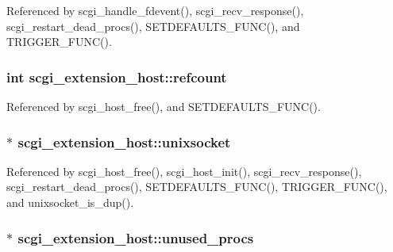Referenced by scgi\-\_\-handle\-\_\-fdevent(), scgi\-\_\-recv\-\_\-response(), scgi\-\_\-restart\-\_\-dead\-\_\-procs(), S\-E\-T\-D\-E\-F\-A\-U\-L\-T\-S\-\_\-\-F\-U\-N\-C(), and T\-R\-I\-G\-G\-E\-R\-\_\-\-F\-U\-N\-C().

\hypertarget{structscgi__extension__host_a718dfa9a434051118c2436755354f0fe}{
\subsubsection[{refcount}]{\setlength{\rightskip}{0pt plus 5cm}int scgi\-\_\-extension\-\_\-host\-::refcount}}\label{structscgi__extension__host_a718dfa9a434051118c2436755354f0fe}


Referenced by scgi\-\_\-host\-\_\-free(), and S\-E\-T\-D\-E\-F\-A\-U\-L\-T\-S\-\_\-\-F\-U\-N\-C().

\hypertarget{structscgi__extension__host_a530aef6533bec26314ca5c879f2c36a8}{
\subsubsection[{unixsocket}]{$\ast$ scgi\-\_\-extension\-\_\-host\-::unixsocket}}\label{structscgi__extension__host_a530aef6533bec26314ca5c879f2c36a8}


Referenced by scgi\-\_\-host\-\_\-free(), scgi\-\_\-host\-\_\-init(), scgi\-\_\-recv\-\_\-response(), scgi\-\_\-restart\-\_\-dead\-\_\-procs(), S\-E\-T\-D\-E\-F\-A\-U\-L\-T\-S\-\_\-\-F\-U\-N\-C(), T\-R\-I\-G\-G\-E\-R\-\_\-\-F\-U\-N\-C(), and unixsocket\-\_\-is\-\_\-dup().

\hypertarget{structscgi__extension__host_ab7fa2ce21a64cae0964585c22f34aec6}{
\subsubsection[{unused\-\_\-procs}]{$\ast$ scgi\-\_\-extension\-\_\-host\-::unused\-\_\-procs}}\label{structscgi__extension__host_ab7fa2ce21a64cae0964585c22f34aec6}


